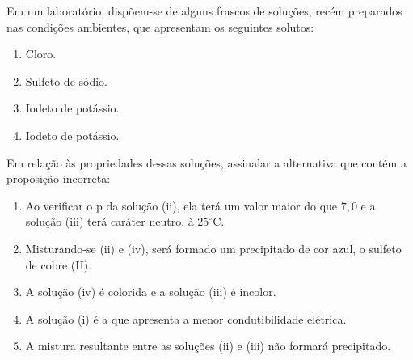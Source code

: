 Em um laboratório, dispõem-se de alguns frascos de soluções, recém preparados nas condições ambientes, que apresentam os seguintes solutos: 

\begin{enumerate}[label = (\roman*)]
	\item Cloro.
	\item Sulfeto de sódio.
	\item Iodeto de potássio.
	\item Iodeto de potássio.
\end{enumerate}

Em relação às propriedades dessas soluções, assinalar a alternativa que contém a proposição incorreta:

\begin{enumerate}[label = (\alph*)] 	
	\item Ao verificar o p da solução (ii), ela terá um valor maior do que $7,0$ e a solução (iii) terá caráter neutro, à $25 ^\circ$C. 
	\item Misturando-se (ii) e (iv), será formado um precipitado de cor azul, o sulfeto de cobre (II).
	\item A solução (iv) é colorida e a solução (iii) é incolor. 
	\item A solução (i) é a que apresenta a menor condutibilidade elétrica.
	\item A mistura resultante entre as soluções (ii) e (iii) não formará precipitado.
\end{enumerate}
